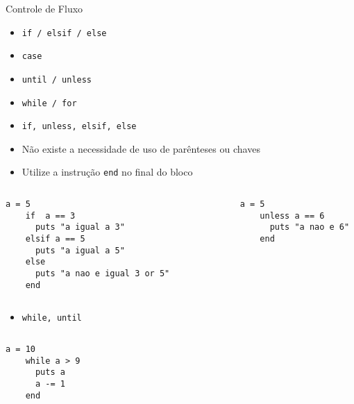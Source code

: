 
\begin{frame}{Controle de Fluxo}
  \begin{itemize}
    \item \verb!if / elsif / else!
    \item \verb!case!
    \item \verb!until / unless!
    \item \verb!while / for!
  \end{itemize}   
\pagebreak
  \begin{itemize}
    \item \verb!if, unless, elsif, else!
    \item Não existe a necessidade de uso de parênteses ou chaves
    \item Utilize a instrução \verb!end! no final do bloco
  \end{itemize}   
  \begin{columns}
    \begin{column}{0.5\textwidth}
      \begin{lstlisting}[style=RubyInputStyle, caption=if.rb]
    a = 5 
    if  a == 3                    
      puts "a igual a 3"                  
    elsif a == 5 
      puts "a igual a 5"                   
    else                              
      puts "a nao e igual 3 or 5"
    end 
      \end{lstlisting}  
    \end{column}
    \begin{column}{0.5\textwidth}  %
      \begin{lstlisting}[style=RubyInputStyle, caption=unless.rb]
    a = 5 
    unless a == 6
      puts "a nao e 6"
    end 
      \end{lstlisting}
    \end{column}
  \end{columns}
\pagebreak
  \begin{itemize}
    \item \verb!while, until!
  \end{itemize}   
  \begin{columns}
    \begin{column}{0.5\textwidth}
      \begin{lstlisting}[style=RubyInputStyle, caption=while.rb]
    a = 10
    while a > 9
      puts a 
      a -= 1 
    end 
      \end{lstlisting}  
    \end{column}
    \begin{column}{0.5\textwidth}  %

\end{column}
\end{columns}
\end{frame}

